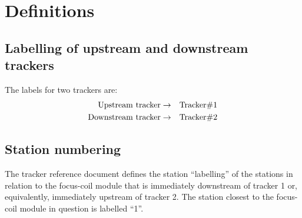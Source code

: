 \section{Definitions}
\label{Sect:Definitions}

\subsection{Labelling of upstream and downstream trackers}
\label{SubSect:TkrLabel}

The labels for two trackers are: 
\begin{eqnarray}
  {\rm Upstream~tracker}   & \rightarrow & {\rm Tracker \# 1} \nonumber \\
  {\rm Downstream~tracker} & \rightarrow & {\rm Tracker \# 2} \nonumber 
\end{eqnarray}

\subsection{Station numbering}
\label{SubSect:StnNumbering}

The tracker reference document defines the station ``labelling'' of the
stations in relation to the focus-coil module that is immediately
downstream of tracker 1 or, equivalently, immediately upstream of
tracker 2. 
The station closest to the focus-coil module in question is labelled 
``1''.  
